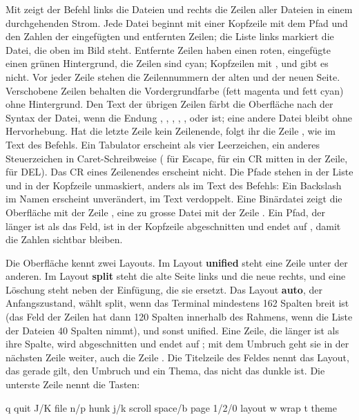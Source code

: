 Mit  zeigt der Befehl links die Dateien und rechts die Zeilen aller Dateien in
einem durchgehenden Strom. Jede Datei beginnt mit einer Kopfzeile mit dem Pfad und den Zahlen
 der eingefügten und entfernten Zeilen; die Liste links markiert die Datei, die
oben im Bild steht. Entfernte Zeilen haben einen roten, eingefügte einen grünen Hintergrund,
die Zeilen  sind cyan; Kopfzeilen mit , \type{---} und \type{+++} gibt es
nicht. Vor jeder Zeile stehen die Zeilennummern der alten und der neuen Seite.
Verschobene Zeilen behalten die Vordergrundfarbe (fett magenta und fett cyan) ohne Hintergrund.
Den Text der übrigen Zeilen färbt die Oberfläche nach der Syntax der Datei, wenn die Endung
, , , , ,  oder
 ist; eine andere Datei bleibt ohne Hervorhebung.
Hat die letzte Zeile kein Zeilenende, folgt ihr die Zeile
, wie im Text des Befehls.
Ein Tabulator erscheint als vier Leerzeichen, ein anderes Steuerzeichen in Caret-Schreibweise
(\type{^[} für Escape,  für ein CR mitten in der Zeile,  für DEL).
Das CR eines Zeilenendes \type{\r\n} erscheint nicht.
Die Pfade stehen in der Liste und in der Kopfzeile unmaskiert, anders als im Text des Befehls:
Ein Backslash im Namen erscheint unverändert, im Text verdoppelt.
Eine Binärdatei zeigt die Oberfläche mit der Zeile , eine zu grosse
Datei mit der Zeile .
Ein Pfad, der länger ist als das Feld, ist in der Kopfzeile abgeschnitten und endet auf
, damit die Zahlen  sichtbar bleiben.

Die Oberfläche kennt zwei Layouts. Im Layout {\bf unified} steht eine Zeile unter der anderen.
Im Layout {\bf split} steht die alte Seite links und die neue rechts, und eine Löschung steht
neben der Einfügung, die sie ersetzt. Das Layout {\bf auto}, der Anfangszustand, wählt split,
wenn das Terminal mindestens 162 Spalten breit ist (das Feld der Zeilen hat dann 120 Spalten
innerhalb des Rahmens, wenn die Liste der Dateien 40 Spalten nimmt), und sonst unified.
Eine Zeile, die länger ist als ihre Spalte, wird abgeschnitten und endet auf ;
mit dem Umbruch geht sie in der nächsten Zeile weiter, auch die Zeile
.
Die Titelzeile des Feldes nennt das Layout, das gerade gilt, den Umbruch und ein Thema, das nicht
das dunkle ist.
Die unterste Zeile nennt die Tasten:

\starttyping
q quit J/K file n/p hunk j/k scroll space/b page 1/2/0 layout w wrap t theme
\stoptyping

